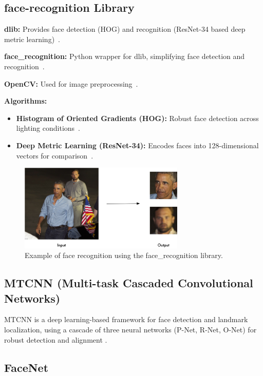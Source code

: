 \subsection{face-recognition Library}

\textbf{dlib:} Provides face detection (HOG) and recognition (ResNet-34 based deep metric learning)~\cite{dlib}.

\textbf{face\_recognition:} Python wrapper for dlib, simplifying face detection and recognition~\cite{facerecognition}.

\textbf{OpenCV:} Used for image preprocessing~\cite{opencv}.

\textbf{Algorithms:}
\begin{itemize}
    \item \textbf{Histogram of Oriented Gradients (HOG):} Robust face detection across lighting conditions~\cite{dalal2005hog}.
    \item \textbf{Deep Metric Learning (ResNet-34):} Encodes faces into 128-dimensional vectors for comparison~\cite{schroff2015facenet}.
\end{itemize}

\begin{figure}[ht!]
    \centering
    \includegraphics[width=0.7\textwidth]{../Files/face_recognition_example.png}
    \caption{Example of face recognition using the face\_recognition library.}
    \label{fig:face-recognition-example}
\end{figure}

\subsection{MTCNN (Multi-task Cascaded Convolutional Networks)}

MTCNN is a deep learning-based framework for face detection and landmark localization, using a cascade of three neural networks (P-Net, R-Net, O-Net) for robust detection and alignment \cite{zhang2016mtcnn}.

\subsection{FaceNet}

